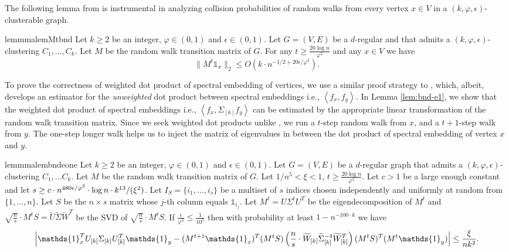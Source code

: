 \documentclass[letterpaper,11pt]{article}
\theoremstyle{plain}
\theoremstyle{definition}
\theoremstyle{remark}
\newcommand{\e}{\epsilon}
\newcommand{\rdp}[1]
  {\ensuremath{\left\langle #1 \right\rangle}}
\newcommand{\mycolor}[1]{\textcolor{black}{#1}}
\begin{document}
The following lemma from \cite{GluchKLMS21} is instrumental in analyzing collision probabilities
of random walks from every vertex $x \in V$ in a $(k, \varphi, \e)$-clusterable graph.

\begin{restatable}{lemmma}{lemMtbnd}\label{lem:Mt-bnd}
Let $k \geq 2$ be an integer, $\varphi \in (0,1)$ and $\epsilon\in (0,1)$. Let $G=(V,E)$ be a 
$d$-regular and that admits a $(k,\varphi,\epsilon)$-clustering  $C_1, \ldots , C_k$.
Let $M$ be the random walk transition matrix of $G$. For any $t\geq \frac{20\log n}{\varphi^2}$ 
and any $x\in V$ we have 
\[\|M^{t}\mathds{1}_{x}\|_2 \leq O\left(k \cdot n^{-1/2+20\epsilon /\varphi^2}\right) \text{.}\]
\end{restatable}


To prove the correctness of weighted dot product of spectral embedding of vertices, we use a similar proof strategy to \cite{GluchKLMS21},  
which, albeit, develops an 
estimator for the \emph{unweighted} dot product  between spectral embeddings i.e., $\rdp{f_x, f_y}$. In Lemma \ref{lem:bnd-e1}, we show that the weighted dot product of
spectral embeddings i.e.,  $\rdp{f_x, \Sigma_{[k]}f_y}$ can be estimated by the appropriate linear transformation of the random walk transition matrix. Since we seek weighted dot products unlike \cite{GluchKLMS21},  we run a $t$-step random walk from $x$, and a $t+1$-step walk from $y$. The one-step longer walk helps us to inject the matrix of eigenvalues in between the dot product of spectral embedding of vertex $x$ and $y$. 



\begin{restatable}{lemmma}{lembndeone}
\label{lem:bnd-e1}
Let $k \geq 2$ be an integer, $\varphi \in (0,1)$ and $\epsilon\in (0,1)$. Let $G=(V,E)$ be a $d$-regular 
graph that admits a $(k,\varphi,\epsilon)$-clustering $C_1, \ldots C_k$. Let $M$ be  the random walk 
transition matrix of $G$. Let  $1/n^5 < \xi < 1$, $t\geq  \frac{20\log n}{\varphi^2}$. Let $c>1$ be a 
large enough constant and let 
$s\geq c
\cdot n^{480\epsilon / \varphi^2}\cdot \log n \cdot \mycolor{k^{13}}/({\xi}^2) $. 
Let $I_S=\{i_1,\ldots, i_s\}$ be a multiset of $s$ indices chosen independently and uniformly at random from
$\{1,\dots,n\}$. Let $S$ be the $n\times s$ matrix whose $j$-th column equals $\mathds{1}_{i_j}$.  
Let $M^t=U\Sigma^tU^T$ be the eigendecomposition of $M^t$ and 
$\sqrt{\frac{n}{s}} \cdot M^tS=\widetilde{U}\widetilde{\Sigma}\widetilde{W}^T$  be the SVD of 
$\sqrt{\frac{n}{s}} \cdot M^tS$. If $\frac{\epsilon}{\varphi^2}\leq \frac{1}{10^5}$ then with probability 
at least $1-n^{-100\cdot k}$ we have
\[\left|\mathds{1}_x^T U_{[k]}\Sigma_{[k]}{U}_{[k]}^T  \mathds{1}_y - (M^{t+1}\mathds{1}_{x})^T  (M^tS)\left(\frac{n}{s}\cdot\widetilde{W}_{[k]} \widetilde{\Sigma}^{-4}_{[k]} \widetilde{W}^T_{[k]}\right) (M^tS)^T (M^{t}\mathds{1}_{y}) \right| \leq  \frac{\xi}{\mycolor{n k^2}}\text{.}
\]
\end{restatable}
\end{document}
